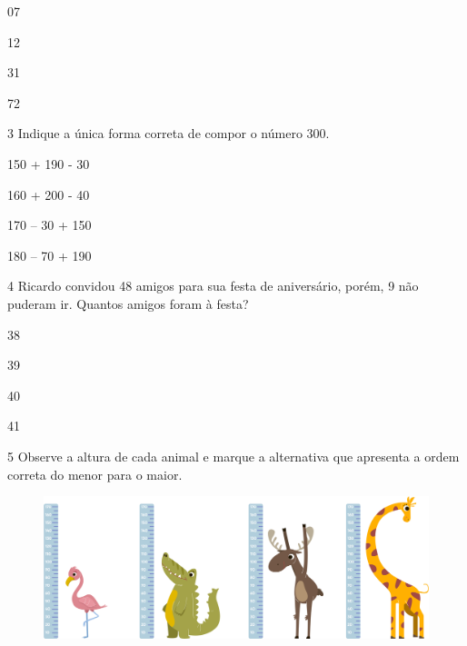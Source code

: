 \begin{escolha}[itemsep=-5pt]
\item 07

\item 12

\item 31

\item 72
\end{escolha}

\num{3} Indique a única forma correta de compor o número 300.

\begin{escolha}[itemsep=-5pt]
\item 150 + 190 - 30

\item 160 + 200 - 40

\item 170 -- 30 + 150

\item 180 -- 70 + 190
\end{escolha}

\num{4} Ricardo convidou 48 amigos para sua festa de aniversário, porém, 9 não
puderam ir. Quantos amigos foram à festa?

\begin{escolha}[itemsep=-5pt]
\item 38

\item 39

\item 40

\item 41
\end{escolha}

\num{5} Observe a altura de cada animal e marque a alternativa que apresenta a
ordem correta do menor para o maior.

\begin{figure}[H]
\includegraphics[width=\textwidth]{./media/image139.png}
\end{figure}

